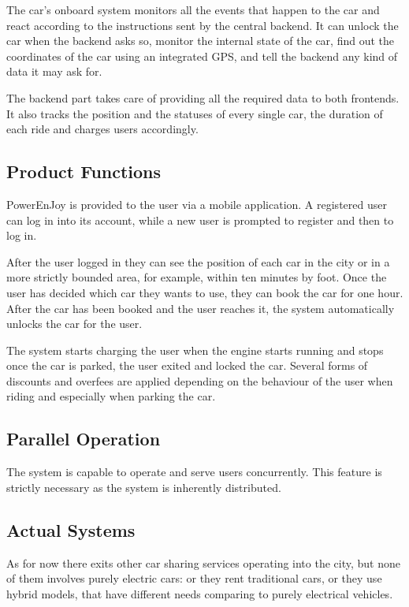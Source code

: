 \documentclass[11pt]{article} %
\newcommand{\pe}{PowerEnJoy }
\begin{document}
The car's onboard system monitors all the events that happen to the car and react according to the instructions sent by the central backend. It can unlock the car when the backend asks so, monitor the internal state of the car, find out the coordinates of the car using an integrated GPS, and tell the backend any kind of data it may ask for.

The backend part takes care of providing all the required data to both frontends. It also tracks the position and the statuses of every single car, the duration of each ride and charges users accordingly.
  
\subsection{Product Functions}
  
  \pe is provided to the user via a mobile application. A registered user can log in into its account, while a new user is prompted to register and then to log in.
  
  After the user logged in they can see the position of each car in the city or in a more strictly bounded area, for example, within ten minutes by foot. Once the user has decided which car they wants to use, they can book the car for one hour. After the car has been booked and the user reaches it, the system automatically unlocks the car for the user.
  
  The system starts charging the user when the engine starts running and stops once the car is parked, the user exited and locked the car. Several forms of discounts and overfees are applied depending on the behaviour of the user when riding and especially when parking the car.


\subsection{Parallel Operation}
  The system is capable to operate and serve users concurrently. This feature is strictly necessary as the system is inherently distributed.

\subsection{Actual Systems}
As for now there exits other car sharing services operating into the city, but none of them involves purely electric cars: or they rent traditional cars, or they use hybrid models, that have different needs comparing to purely electrical vehicles.
\end{document}
